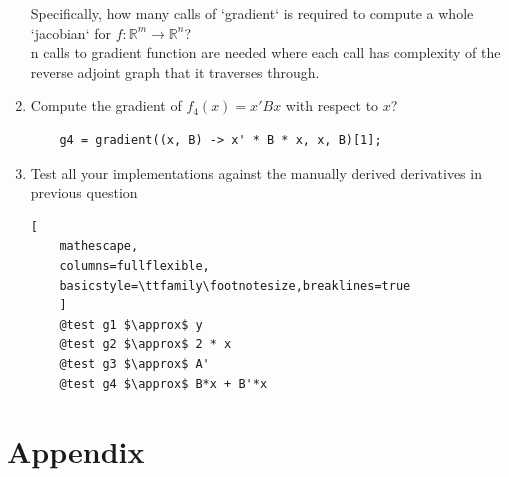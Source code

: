\documentclass[12pt,letter]{article}
\begin{document}
\begin{enumerate}
    Specifically, how many calls of `gradient` is required to compute a whole `jacobian` for $f : \mathbb{R}^m \rightarrow \mathbb{R}^n$?\\

    n calls to gradient function are needed where each call has complexity of the reverse adjoint graph that it traverses through.\\

\item Compute the gradient of $f_4(x) = x'Bx$ with respect to $x$?
\begin{verbatim}
    g4 = gradient((x, B) -> x' * B * x, x, B)[1];
\end{verbatim}

\item Test all your implementations against the manually derived derivatives in previous question

  \begin{lstlisting}[
    mathescape,
    columns=fullflexible,
    basicstyle=\ttfamily\footnotesize,breaklines=true
    ]
    @test g1 $\approx$ y
    @test g2 $\approx$ 2 * x
    @test g3 $\approx$ A'
    @test g4 $\approx$ B*x + B'*x
  \end{lstlisting}

\end{enumerate}

\pagebreak

\section{Appendix}
\end{document}
